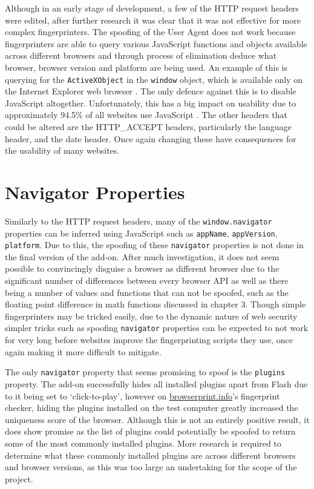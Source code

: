 Although in an early stage of development, a few of the HTTP request headers were edited, after further research it was clear that it was not effective for more complex fingerprinters.
The spoofing of the User Agent does not work because fingerprinters are able to query various JavaScript functions and objects available across different browsers and through process of elimination deduce what browser, browser version and platform are being used.
An example of this is querying for the \texttt{ActiveXObject} in the \texttt{window} object, which is available only on the Internet Explorer web browser \citep{activeX}.
The only defence against this is to disable JavaScript altogether.
Unfortunately, this has a big impact on usability due to approximately 94.5\% of all websites use JavaScript \citep{w3-javascript}.
The other headers that could be altered are the HTTP\_ACCEPT headers, particularly the language header, and the date header.
Once again changing these have consequences for the usability of many websites.

\section{Navigator Properties}

Similarly to the HTTP request headers, many of the \texttt{window.navigator} properties can be inferred using JavaScript such as \texttt{appName}, \texttt{appVersion}, \texttt{platform}.
Due to this, the spoofing of these \texttt{navigator} properties is not done in the final version of the add-on.
After much investigation, it does not seem possible to convincingly disguise a browser as different browser due to the significant number of differences between every browser API as well as there being a number of values and functions that can not be spoofed, such as the floating point difference in math functions discussed in chapter 3.
Though simple fingerprinters may be tricked easily, due to the dynamic nature of web security simpler tricks such as spoofing \texttt{navigator} properties can be expected to not work for very long before websites improve the fingerprinting scripts they use, once again making it more difficult to mitigate.

The only \texttt{navigator} property that seems promising to spoof is the \texttt{plugins} property.
The add-on successfully hides all installed plugins apart from Flash due to it being set to `click-to-play', however on \url{browserprint.info}'s fingerprint checker, hiding the plugins installed on the test computer greatly increased the uniqueness score of the browser.
Although this is not an entirely positive result, it does show promise as the list of plugins could potentially be spoofed to return some of the most commonly installed plugins.
More research is required to determine what these commonly installed plugins are across different browsers and browser versions, as this was too large an undertaking for the scope of the project.

